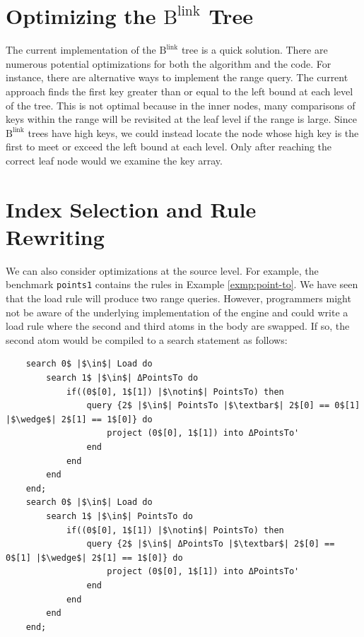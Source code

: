 \documentclass[11pt]{report}
\theoremstyle{definition}
\begin{document}
\section{Optimizing the $\text{B}^{\text{link}}$ Tree}

The current implementation of the $\text{B}^{\text{link}}$ tree is a quick solution. There are numerous potential optimizations for both the algorithm and the code. For instance, there are alternative ways to implement the range query. The current approach finds the first key greater than or equal to the left bound at each level of the tree. This is not optimal because in the inner nodes, many comparisons of keys within the range will be revisited at the leaf level if the range is large. Since $\text{B}^{\text{link}}$ trees have high keys, we could instead locate the node whose high key is the first to meet or exceed the left bound at each level. Only after reaching the correct leaf node would we examine the key array.

\section{Index Selection and Rule Rewriting}

We can also consider optimizations at the source level. For example, the benchmark \texttt{points1} contains the rules in Example \ref{exmp:point-to}. We have seen that the load rule will produce two range queries. However, programmers might not be aware of the underlying implementation of the engine and could write a load rule where the second and third atoms in the body are swapped. If so, the second atom would be compiled to a search statement as follows:

\begin{verbatim}
    search 0$ |$\in$| Load do
        search 1$ |$\in$| ΔPointsTo do
            if((0$[0], 1$[1]) |$\notin$| PointsTo) then
                query {2$ |$\in$| PointsTo |$\textbar$| 2$[0] == 0$[1] |$\wedge$| 2$[1] == 1$[0]} do
                    project (0$[0], 1$[1]) into ΔPointsTo'
                end
            end
        end
    end;
    search 0$ |$\in$| Load do
        search 1$ |$\in$| PointsTo do
            if((0$[0], 1$[1]) |$\notin$| PointsTo) then
                query {2$ |$\in$| ΔPointsTo |$\textbar$| 2$[0] == 0$[1] |$\wedge$| 2$[1] == 1$[0]} do
                    project (0$[0], 1$[1]) into ΔPointsTo'
                end
            end
        end
    end;
\end{verbatim}
\end{document}
